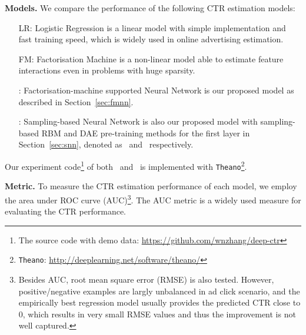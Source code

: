\documentclass{llncs}
\newcommand{\ft}{\texttt}
\newcommand{\fmnn}{\text{FNN}}
\newcommand{\snn}{\text{SNN}}
\newcommand{\snnrbm}{\text{SNN-RBM}}
\newcommand{\snndae}{\text{SNN-DAE}}
\begin{document}



\noindent \textbf{Models.} We compare the performance of the following CTR estimation models:
\begin{itemize}
  \item [LR:] Logistic Regression \cite{richardson2007predicting} is a linear model with simple implementation and fast training speed, which is widely used in online advertising estimation.
  \item [FM:] Factorisation Machine \cite{rendle2012factorization} is a non-linear model able to estimate feature interactions even in problems with huge sparsity.
  \item [\fmnn:] Factorisation-machine supported Neural Network is our proposed model as described in Section~\ref{sec:fmnn}.
  \item [\snn:] Sampling-based Neural Network is also our proposed model with sampling-based RBM and DAE pre-training methods for the first layer in Section~\ref{sec:snn}, denoted as \snnrbm~and \snndae~respectively.
\end{itemize}
Our experiment code\footnote{The source code with demo data: \url{https://github.com/wnzhang/deep-ctr}} of both \fmnn~and \snn~is implemented with \ft{Theano}\footnote{\ft{Theano}: \url{http://deeplearning.net/software/theano/}}.

\noindent \textbf{Metric.} To measure the CTR estimation performance of each model, we employ the area under ROC curve (AUC)\footnote{Besides AUC, root mean square error (RMSE) is also tested. However, positive/negative examples are largly unbalanced in ad click scenario, and the empirically best regression model usually provides the predicted CTR close to 0, which results in very small RMSE values and thus the improvement is not well captured.}. The AUC \cite{graepel2010web} metric is a widely used measure for evaluating the CTR performance.
\end{document}
